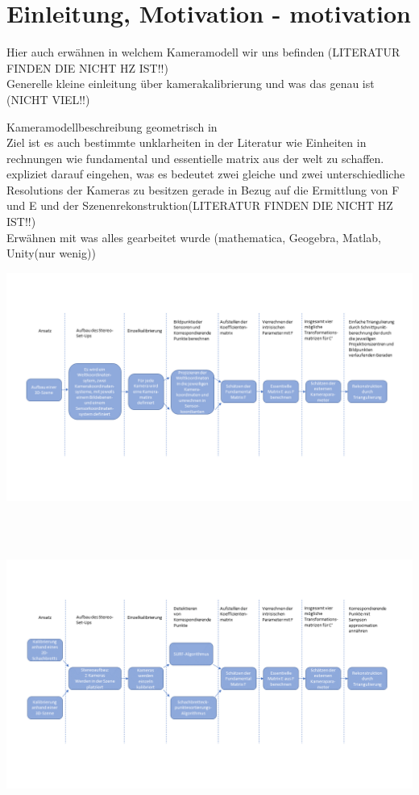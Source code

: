 \chapter{Einleitung, Motivation - motivation}

Hier auch erwähnen in welchem Kameramodell wir uns befinden (LITERATUR FINDEN DIE NICHT HZ IST!!)\\
Generelle kleine einleitung über kamerakalibrierung und was das genau ist (NICHT VIEL!!)

Kameramodellbeschreibung geometrisch in \cite{Jianzhong}\\

Ziel ist es auch bestimmte unklarheiten in der Literatur wie Einheiten in rechnungen wie fundamental und essentielle matrix aus der welt zu schaffen.\\

expliziet darauf eingehen, was es bedeutet zwei gleiche und zwei unterschiedliche Resolutions der Kameras zu besitzen gerade in Bezug auf die Ermittlung von F und E und der Szenenrekonstruktion(LITERATUR FINDEN DIE NICHT HZ IST!!)\\

Erwähnen mit was alles gearbeitet wurde (mathematica, Geogebra, Matlab, Unity(nur wenig))


	\begin{minipage}{\linewidth}
	\centering
	\includegraphics[width=1.\linewidth]{images/ArbeitsProzessMinimal.png}
\end{minipage}\\ \\


	\begin{minipage}{\linewidth}
	\centering
	\includegraphics[width=1.\linewidth]{images/ArbeitsProzessReal.png}
\end{minipage}\\ \\

